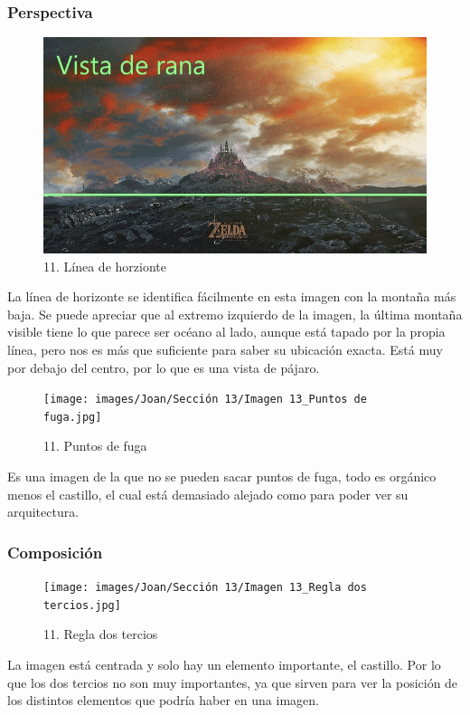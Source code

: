 \documentclass[12pt]{article}
\begin{document}
            \subsubsection{Perspectiva}
            \begin{figure}[H]
          \centering
          \includegraphics[scale=0.35]{images/Joan/Sección 13/Imagen 13_Línea Horizonte.jpg}
          \caption{\small 11. Línea de horzionte}
        \end{figure}
        La línea de horizonte se identifica fácilmente en esta imagen con la montaña más baja. Se puede apreciar que al extremo izquierdo de la imagen, la última montaña visible tiene lo que parece ser océano al lado, aunque está tapado por la propia línea, pero nos es más que suficiente para saber su ubicación exacta. Está muy por debajo del centro, por lo que es una vista de pájaro. 

        \begin{figure}[H]
          \centering
          \texttt{[image: images/Joan/Sección 13/Imagen 13\_Puntos de fuga.jpg]}
          \caption{\small 11. Puntos de fuga}
        \end{figure}
        Es una imagen de la que no se pueden sacar puntos de fuga, todo es orgánico menos el castillo, el cual está demasiado alejado como para poder ver su arquitectura. 

            \subsubsection{Composición}
            \begin{figure}[H]
          \centering
          \texttt{[image: images/Joan/Sección 13/Imagen 13\_Regla dos tercios.jpg]}
          \caption{\small 11. Regla dos tercios}
        \end{figure}
        La imagen está centrada y solo hay un elemento importante, el castillo. Por lo que los dos tercios no son muy importantes, ya que sirven para ver la posición de los distintos elementos que podría haber en una imagen. 
\end{document}
